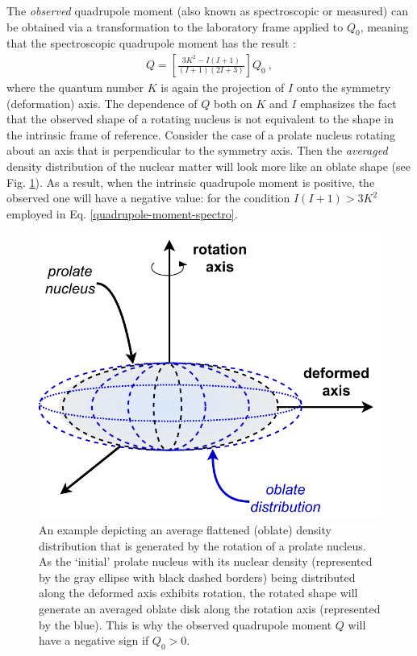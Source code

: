 The \emph{observed} quadrupole moment (also known as spectroscopic or measured) can be obtained via a transformation to the laboratory frame applied to $Q_0$, meaning that the spectroscopic quadrupole moment has the result \cite{casten2000nuclear}:
\begin{align}
    Q=\left[\frac{3K^2-I(I+1)}{(I+1)(2I+3)}\right]Q_0\ ,
    \label{quadrupole-moment-spectro}
\end{align}
where the quantum number $K$ is again the projection of $I$ onto the symmetry (deformation) axis. The dependence of $Q$ both on $K$ and $I$ emphasizes the fact that the observed shape of a rotating nucleus is not equivalent to the shape in the intrinsic frame of reference. Consider the case of a prolate nucleus rotating about an axis that is perpendicular to the symmetry axis. Then the \emph{averaged} density distribution of the nuclear matter will look more like an oblate shape (see Fig. \ref{fig-averaged-prolate-density}). As a result, when the intrinsic quadrupole moment is positive, the observed one will have a negative value: for the condition $I(I+1)>3K^2$ employed in Eq. \ref{quadrupole-moment-spectro}.
\begin{figure}
    \centering
    \includegraphics[scale=0.65]{Chapters/Figures/averaged_nuclearMatter_prolate.pdf}
    \caption{An example depicting an average flattened (oblate) density distribution that is generated by the rotation of a prolate nucleus. As the `initial' prolate nucleus with its nuclear density (represented by the gray ellipse with black dashed borders) being distributed along the deformed axis exhibits rotation, the rotated shape will generate an averaged oblate disk along the rotation axis (represented by the blue). This is why the observed quadrupole moment $Q$ will have a negative sign if $Q_0>0$.}
    \label{fig-averaged-prolate-density}
\end{figure}

